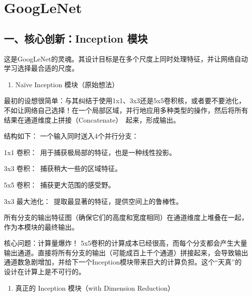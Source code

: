 \setcounter{section}{2}

\hypertarget{googlenet}{%
\section{GoogLeNet}\label{googlenet}}

\hypertarget{ux4e00ux6838ux5fc3ux521bux65b0inception-ux6a21ux5757}{%
\subsection{一、核心创新：Inception 模块}\label{ux4e00ux6838ux5fc3ux521bux65b0inception-ux6a21ux5757}}

这是GoogLeNet的灵魂。其设计目标是在多个尺度上同时处理特征，并让网络自动学习选择最合适的尺度。

\begin{enumerate}
\def\labelenumi{\arabic{enumi}.}
\tightlist
\item
  Naïve Inception 模块（原始想法）
\end{enumerate}

最初的设想很简单：与其纠结于使用1x1、3x3还是5x5卷积核，或者要不要池化，不如让网络自己选择！在一个局部区域，并行地应用多种类型的操作，然后将所有结果在通道维度上拼接（Concatenate）~起来，形成输出。

结构如下：
一个输入同时送入4个并行分支：

1x1 卷积：~用于捕获极局部的特征，也是一种线性投影。

3x3 卷积：~捕获稍大一些的区域特征。

5x5 卷积：~捕获更大范围的感受野。

3x3 最大池化：~提取最显著的特征，提供空间上的鲁棒性。

所有分支的输出特征图（确保它们的高度和宽度相同）在通道维度上堆叠在一起，作为本模块的最终输出。

核心问题：计算量爆炸！
5x5卷积的计算成本已经很高，而每个分支都会产生大量输出通道。直接将所有分支的输出（可能成百上千个通道）拼接起来，会导致输出通道数急剧增加，并给下一个Inception模块带来巨大的计算负担。这个``天真''的设计在计算上是不可行的。

\begin{enumerate}
\def\labelenumi{\arabic{enumi}.}
\setcounter{enumi}{1}
\tightlist
\item
  真正的 Inception 模块（with Dimension Reduction）
\end{enumerate}


